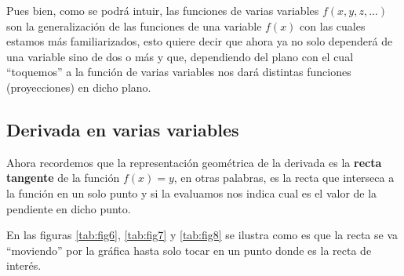 Pues bien, como se podrá intuir, las funciones de varias variables $f(x,y,z,...)$ son la generalización de las funciones de una variable $f(x)$ con las cuales estamos más familiarizados, esto quiere decir que ahora ya no solo dependerá de una variable sino de dos o más y que, dependiendo del plano con el cual ``toquemos'' a la función de varias variables nos dará distintas funciones (proyecciones) en dicho plano.

\subsection*{Derivada en varias variables}
Ahora recordemos que la representación geométrica de la derivada es la \textbf{recta tangente} de la función $f(x)=y$, en otras palabras, es la recta que interseca a la función en un solo punto y si la evaluamos nos indica cual es el valor de la pendiente en dicho punto. 

En las figuras \ref{tab:fig6}, \ref{tab:fig7} y \ref{tab:fig8} se ilustra como es que la recta se va ``moviendo'' por la gráfica hasta solo tocar en un punto donde es la recta de interés. 


